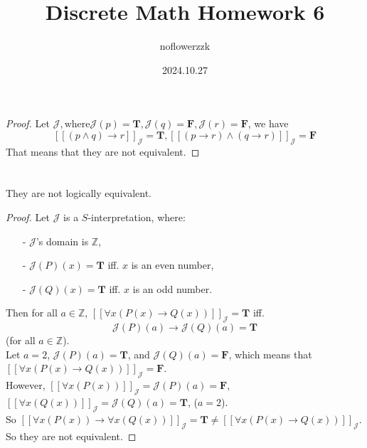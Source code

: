 \documentclass{article}
\title{Discrete Math Homework 6}
\author{noflowerzzk}
\date{2024.10.27}
\begin{document}
\maketitle

\section{}

\begin{proof}
    Let $\mathcal{J}, \text{where} \mathcal{J}(p) = \mathbf{T}, \mathcal{J}(q) = \mathbf{F}, \mathcal{J}(r) = \mathbf{F} $, we have 
    $$
        [\![ (p \land q) \rightarrow r ]\!]_\mathcal{J} = \mathbf{T}, 
        [\![(p \rightarrow r) \land (q \rightarrow r)]\!]_\mathcal{J} = \mathbf{F}
    $$
    That means that they are not equivalent.
\end{proof}

\section{}
They are not logically equivalent.
\begin{proof}
    Let $\mathcal{J}$ is a $S$-interpretation, where: \\
    \begin{itemize}
        \item[-] $\mathcal{J}$'s domain is $\mathbb{Z}$, \\
        \item[-] $\mathcal{J}(P)(x) = \mathbf{T}$ iff. $x$ is an even number, \\
        \item[-] $\mathcal{J}(Q)(x) = \mathbf{T}$ iff. $x$ is an odd number. \\
    
    \end{itemize}
    Then for all $a \in \mathbb{Z}$, $ [\![\forall x(P(x) \rightarrow Q(x))]\!]_\mathcal{J} = \mathbf{T} $ iff. 
    $$ \mathcal{J}(P)(a) \rightarrow \mathcal{J}(Q)(a) = \mathbf{T} $$ (for all $a \in \mathbb{Z}$). \\
    Let $a = 2$, $\mathcal{J}(P)(a) = \mathbf{T}$, and $\mathcal{J}(Q)(a) = \mathbf{F}$, which means that $ [\![\forall x(P(x) \rightarrow Q(x))]\!]_\mathcal{J} = \mathbf{F} $.\\
    However, $[\![\forall x (P(x))]\!]_\mathcal{J} = \mathcal{J}(P)(a) = \mathbf{F}$, $[\![\forall x (Q(x))]\!]_\mathcal{J} = \mathcal{J}(Q)(a) = \mathbf{T}$, ($a = 2$).\\
    So $[\![\forall x (P(x)) \rightarrow \forall x (Q(x))]\!]_\mathcal{J} = \mathbf{T} \neq [\![\forall x(P(x) \rightarrow Q(x))]\!]_\mathcal{J}$. \\
    So they are not equivalent.
\end{proof} 
\end{document}
